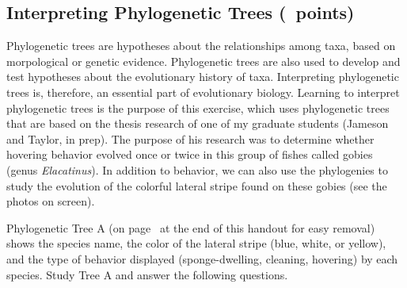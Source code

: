 \documentclass[11pt, addpoints]{exam}
\begin{document}
\subsection*{Interpreting Phylogenetic Trees (\numpoints\ points)}

Phylogenetic trees are hypotheses about the relationships among taxa,
based on morpological or genetic evidence. Phylogenetic trees are also
used to develop and test hypotheses about the evolutionary history of
taxa. Interpreting phylogenetic trees is, therefore, an essential part
of evolutionary biology. Learning to interpret phylogenetic trees is the
purpose of this exercise, which uses phylogenetic trees that are based
on the thesis research of one of my graduate students (Jameson and
Taylor, in prep). The purpose of his research was to determine whether
hovering behavior evolved once or twice in this group of fishes called
gobies (genus \emph{Elacatinus}). In addition to behavior, we can also
use the phylogenies to study the evolution of the colorful lateral
stripe found on these gobies (see the photos on screen).

Phylogenetic Tree A (on page~\pageref{treeA} at the end of this handout for easy
removal) shows the species name, the color of the lateral stripe (blue,
white, or yellow), and the type of behavior displayed (sponge-dwelling,
cleaning, hovering) by each species. Study Tree A and answer the
following questions.
\end{document}
